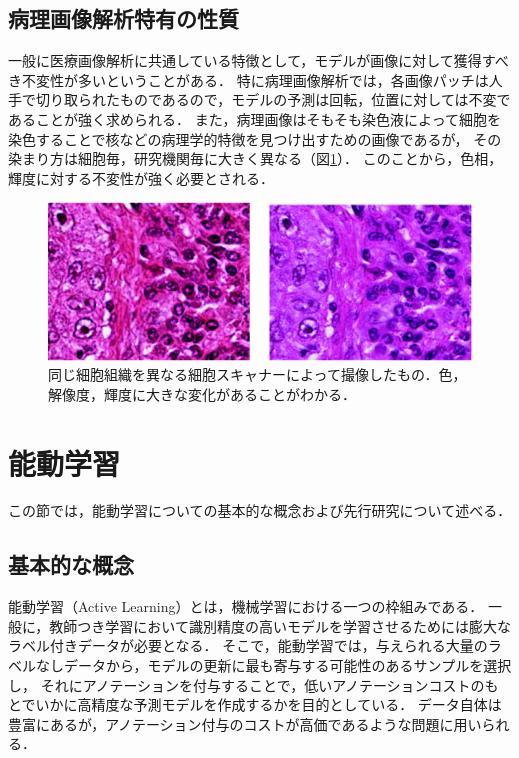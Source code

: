 \subsection{病理画像解析特有の性質}
一般に医療画像解析に共通している特徴として，モデルが画像に対して獲得すべき不変性が多いということがある．
特に病理画像解析では，各画像パッチは人手で切り取られたものであるので，モデルの予測は回転，位置に対しては不変であることが強く求められる．
また，病理画像はそもそも染色液によって細胞を染色することで核などの病理学的特徴を見つけ出すための画像であるが，
その染まり方は細胞毎，研究機関毎に大きく異なる（図\ref{fig:comparison_color}）．
このことから，色相，輝度に対する不変性が強く必要とされる．

\begin{figure}[tbp]
     \begin{center}
      \includegraphics[width=13cm]{figures/comparison_color.pdf}
     \end{center}
    \caption{\label{fig:comparison_color}同じ細胞組織を異なる細胞スキャナーによって撮像したもの．色，解像度，輝度に大きな変化があることがわかる．}
\end{figure}

\section{能動学習}
\label{sec:al}
この節では，能動学習についての基本的な概念および先行研究について述べる．

\subsection{基本的な概念}
能動学習（Active Learning）\cite{settles2010active}とは，機械学習における一つの枠組みである．
一般に，教師つき学習において識別精度の高いモデルを学習させるためには膨大なラベル付きデータが必要となる．
そこで，能動学習では，与えられる大量のラベルなしデータから，モデルの更新に最も寄与する可能性のあるサンプルを選択し，
それにアノテーションを付与することで，低いアノテーションコストのもとでいかに高精度な予測モデルを作成するかを目的としている．
データ自体は豊富にあるが，アノテーション付与のコストが高価であるような問題に用いられる．

